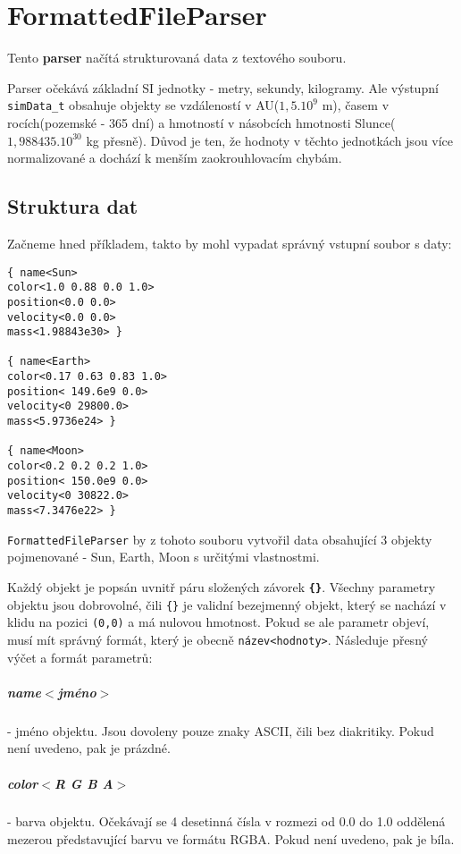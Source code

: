 \chapter{FormattedFileParser}
Tento \textbf{parser} načítá strukturovaná data z textového souboru. 

Parser očekává základní SI jednotky - metry, sekundy, kilogramy. Ale výstupní \texttt{simData\_t} obsahuje objekty se vzdáleností v AU($ 1,5.10^9 $ m), časem v rocích(pozemské - 365 dní) a hmotností v násobcích hmotnosti Slunce($ 1,988435.10^{30} $ kg přesně). Důvod je ten, že hodnoty v těchto jednotkách jsou více normalizované a dochází k menším zaokrouhlovacím chybám.

\section{Struktura dat}
\label{sec:strukturaDat}
Začneme hned příkladem, takto by mohl vypadat správný vstupní soubor s daty:
\begin{lstlisting}
{ name<Sun>
color<1.0 0.88 0.0 1.0>
position<0.0 0.0>
velocity<0.0 0.0>
mass<1.98843e30> }

{ name<Earth>
color<0.17 0.63 0.83 1.0>
position< 149.6e9 0.0>
velocity<0 29800.0>
mass<5.9736e24> }

{ name<Moon>
color<0.2 0.2 0.2 1.0>
position< 150.0e9 0.0>
velocity<0 30822.0>
mass<7.3476e22> }
\end{lstlisting}
\texttt{FormattedFileParser} by z tohoto souboru vytvořil data obsahující 3 objekty pojmenované - Sun, Earth, Moon s určitými vlastnostmi.

Každý objekt je popsán uvnitř páru složených závorek \textbf{\texttt{\{\}}}.
Všechny parametry objektu jsou dobrovolné, čili \lstinline|{}| je validní bezejmenný objekt, který se nachází v klidu na pozici \texttt{(0,0)} a má nulovou hmotnost. Pokud se ale parametr objeví, musí mít správný formát, který je obecně \texttt{název<hodnoty>}. Následuje přesný výčet a formát parametrů:
\paragraph{name$ < $jméno$ > $ } - jméno objektu. Jsou dovoleny pouze znaky ASCII, čili bez diakritiky. Pokud není uvedeno, pak je prázdné.
\paragraph{color$ < $R G B A$ > $} - barva objektu. Očekávají se 4 desetinná čísla v rozmezi od 0.0 do 1.0 oddělená mezerou představující barvu ve formátu RGBA. Pokud není uvedeno, pak je bíla.
